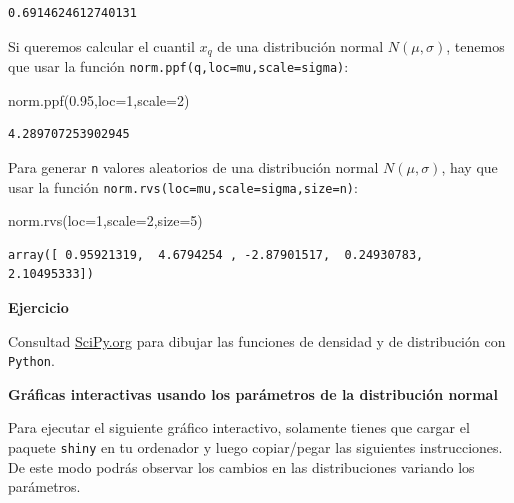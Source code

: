\documentclass[
  letterpaper,
  DIV=11,
  numbers=noendperiod]{scrreprt}
\newenvironment{Shaded}{\begin{snugshade}}{\end{snugshade}}
\newcommand{\DecValTok}[1]{\textcolor[rgb]{0.68,0.00,0.00}{#1}}
\newcommand{\FloatTok}[1]{\textcolor[rgb]{0.68,0.00,0.00}{#1}}
\newcommand{\NormalTok}[1]{\textcolor[rgb]{0.00,0.23,0.31}{#1}}
\newcommand{\OperatorTok}[1]{\textcolor[rgb]{0.37,0.37,0.37}{#1}}
\begin{document}
\begin{verbatim}
0.6914624612740131
\end{verbatim}

Si queremos calcular el cuantil \(x_{q}\) de una distribución normal
\(N(\mu,\sigma)\), tenemos que usar la función
\texttt{norm.ppf(q,loc=mu,scale=sigma)}:

\begin{Shaded}
\begin{Highlighting}[]
\NormalTok{norm.ppf(}\FloatTok{0.95}\NormalTok{,loc}\OperatorTok{=}\DecValTok{1}\NormalTok{,scale}\OperatorTok{=}\DecValTok{2}\NormalTok{)}
\end{Highlighting}
\end{Shaded}

\begin{verbatim}
4.289707253902945
\end{verbatim}

Para generar \texttt{n} valores aleatorios de una distribución normal
\(N(\mu,\sigma)\), hay que usar la función
\texttt{norm.rvs(loc=mu,scale=sigma,size=n)}:

\begin{Shaded}
\begin{Highlighting}[]
\NormalTok{norm.rvs(loc}\OperatorTok{=}\DecValTok{1}\NormalTok{,scale}\OperatorTok{=}\DecValTok{2}\NormalTok{,size}\OperatorTok{=}\DecValTok{5}\NormalTok{)}
\end{Highlighting}
\end{Shaded}

\begin{verbatim}
array([ 0.95921319,  4.6794254 , -2.87901517,  0.24930783,  2.10495333])
\end{verbatim}

\textbf{Ejercicio}

Consultad
\href{https://docs.scipy.org/doc/scipy/reference/generated/scipy.stats.norm.html}{SciPy.org}
para dibujar las funciones de densidad y de distribución con
\texttt{Python}.

\textbf{Gráficas interactivas usando los parámetros de la distribución
normal}

Para ejecutar el siguiente gráfico interactivo, solamente tienes que
cargar el paquete \texttt{shiny} en tu ordenador y luego copiar/pegar
las siguientes instrucciones. De este modo podrás observar los cambios
en las distribuciones variando los parámetros.
\end{document}
